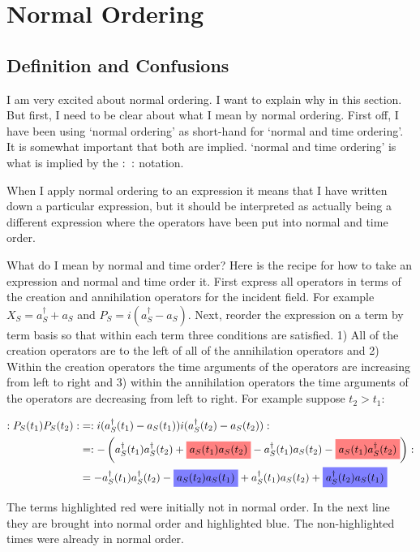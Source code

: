 \documentclass[12pt]{article}
\newcommand{\highlightr}[1]{%
  \colorbox{red!50}{$\displaystyle#1$}}
\newcommand{\highlightb}[1]{%
  \colorbox{blue!50}{$\displaystyle#1$}}
\begin{document}
\section{Normal Ordering}

\subsection{Definition and Confusions}

I am very excited about normal ordering. I want to explain why in this section. But first, I need to be clear about what I mean by normal ordering. First off, I have been using `normal ordering' as short-hand for `normal and time ordering'. It is somewhat important that both are implied. `normal and time ordering' is what is implied by the $:\hspace{5 pt}:$ notation.

When I apply normal ordering to an expression it means that I have written down a particular expression, but it should be interpreted as actually being a different expression where the operators have been put into normal and time order.

What do I mean by normal and time order? Here is the recipe for how to take an expression and normal and time order it. First express all operators in terms of the creation and annihilation operators for the incident field. For example $X_S = a^{\dag}_S + a_S$ and $P_S = i(a^{\dag}_S - a_S)$. Next, reorder the expression on a term by term basis so that within each term three conditions are satisfied. 1) All of the creation operators are to the left of all of the annihilation operators and 2) Within the creation operators the time arguments of the operators are increasing from left to right and 3) within the annihilation operators the time arguments of the operators are decreasing from left to right. For example suppose $t_2>t_1$:

\begin{align}
:P_S(t_1)P_S(t_2): &= :i(a^{\dag}_S(t_1) - a_S(t_1))i(a^{\dag}_S(t_2) - a_S(t_2)):\\
&= :- \left(a^{\dag}_S(t_1)a^{\dag}_S(t_2) + \highlightr{a_S(t_1) a_S(t_2)} - a^{\dag}_S(t_1)a_S(t_2) - \highlightr{a_S(t_1)a^{\dag}_S(t_2)} \right):\\
&= -a^{\dag}_S(t_1)a^{\dag}_S(t_2) - \highlightb{a_S(t_2)a_S(t_1)} + a_S^{\dag}(t_1)a_S(t_2) + \highlightb{a_S^{\dag}(t_2)a_S(t_1)}
\end{align}

The terms highlighted red were initially not in normal order. In the next line they are brought into normal order and highlighted blue. The non-highlighted times were already in normal order.
\end{document}
